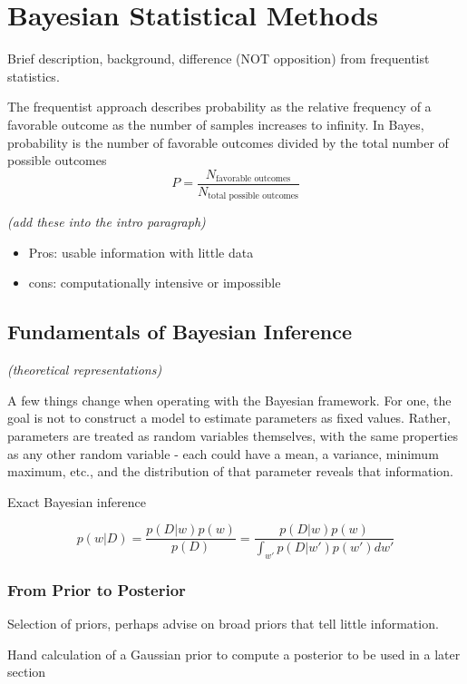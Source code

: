 \chapter{Bayesian Statistical Methods}

Brief description, background, difference (NOT opposition) from frequentist statistics.

The frequentist approach describes probability as the relative frequency of a favorable outcome as the number of samples increases to infinity.  In Bayes, probability is the number of favorable outcomes divided by the total number of possible outcomes \cite{gelmanbayesian3}
$$
P = \frac{N_{\text{favorable outcomes}}}{N_{\text{total possible outcomes}}}
$$

\textit{(add these into the intro paragraph)}
\begin{itemize}
\tightlist
\item
Pros: usable information with little data
\item
cons: computationally intensive or impossible
\end{itemize}


\section{Fundamentals of Bayesian Inference} %

\textit{(theoretical representations)}

A few things change when operating with the Bayesian framework.  For one, the goal is not to construct a model to estimate parameters as fixed values.  Rather, parameters are treated as random variables themselves, with the same properties as any other random variable - each could have a mean, a variance, minimum maximum, etc., and the distribution of that parameter reveals that information.

Exact Bayesian inference

$$
p(w|D) = \frac{p(D|w)p(w)}{p(D)} = \frac{p(D|w)p(w)}{\int_{w'} p(D|w')p(w')dw'}
$$


\subsection{From Prior to Posterior}

Selection of priors, perhaps advise on broad priors that tell little information.

Hand calculation of a Gaussian prior to compute a posterior to be used in a later section


